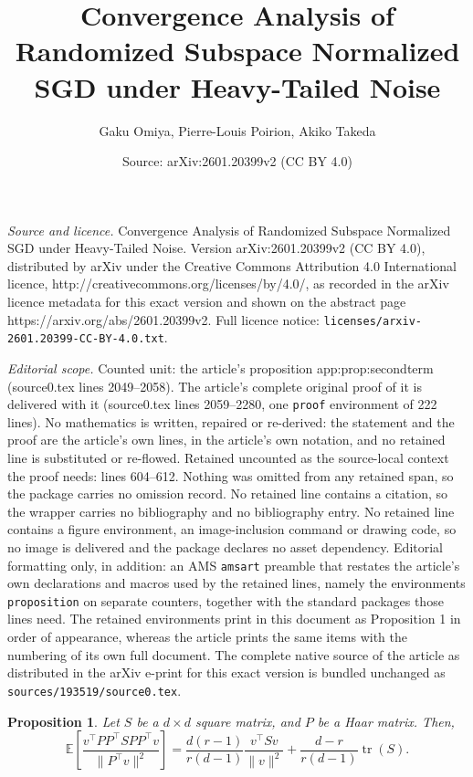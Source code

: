 \documentclass[10pt,a4paper]{amsart}
\title{Convergence Analysis of Randomized Subspace Normalized SGD under Heavy-Tailed Noise}
\author{Gaku Omiya, Pierre-Louis Poirion, Akiko Takeda}
\date{Source: arXiv:2601.20399v2 (CC BY 4.0)}
\newtheorem{proposition}{Proposition}
\begin{document}
\maketitle

\noindent\emph{Source and licence.} Convergence Analysis of Randomized Subspace Normalized SGD under Heavy-Tailed Noise. Version arXiv:2601.20399v2 (CC BY 4.0), distributed by arXiv under the Creative Commons Attribution 4.0 International licence, http://creativecommons.org/licenses/by/4.0/, as recorded in the arXiv licence metadata for this exact version and shown on the abstract page https://arxiv.org/abs/2601.20399v2. Full licence notice: \texttt{licenses/arxiv-2601.20399-CC-BY-4.0.txt}.\par\smallskip

\noindent\textit{Editorial scope.} Counted unit: the article's proposition app:prop:secondterm (source0.tex lines 2049--2058). The article's complete original proof of it is delivered with it (source0.tex lines 2059--2280, one \texttt{proof} environment of 222 lines). No mathematics is written, repaired or re-derived: the statement and the proof are the article's own lines, in the article's own notation, and no retained line is substituted or re-flowed.  Retained uncounted as the source-local context the proof needs: lines 604--612.  Nothing was omitted from any retained span, so the package carries no omission record.  No retained line contains a citation, so the wrapper carries no bibliography and no bibliography entry.  No retained line contains a figure environment, an image-inclusion command or drawing code, so no image is delivered and the package declares no asset dependency.  Editorial formatting only, in addition: an AMS \texttt{amsart} preamble that restates the article's own declarations and macros used by the retained lines, namely the environments \texttt{proposition} on separate counters, together with the standard packages those lines need.  The retained environments print in this document as Proposition 1 in order of appearance, whereas the article prints the same items with the numbering of its own full document.  The complete native source of the article as distributed in the arXiv e-print for this exact version is bundled unchanged as \texttt{sources/193519/source0.tex}.
\begin{proposition}\label{prop:secondterm}
Let $S$ be a $d\times d$ square matrix, and $P$ be a Haar matrix. Then,
\[
\mathbb{E}\left[\frac{v^\top PP^\top S PP^\top v}{\|P^\top v\|^2}\right]
=
\frac{d(r-1)}{r(d-1)}\frac{v^\top Sv}{\|v\|^2}
+\frac{d-r}{r(d-1)}\operatorname{tr}(S).
\]
\end{proposition}
\end{document}
